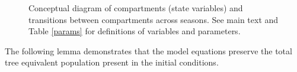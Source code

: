 \begin{figure}
  \label{diagram}
  \caption[Conceptual diagram of compartments (state variables) and transitions between compartments across seasons.]{Conceptual diagram of compartments (state variables) and transitions between compartments across seasons.  See main text and Table \ref{params} for definitions of variables and parameters.}
\end{figure}




The following lemma demonstrates that the model equations preserve the total tree equivalent population present in the initial conditions. 


